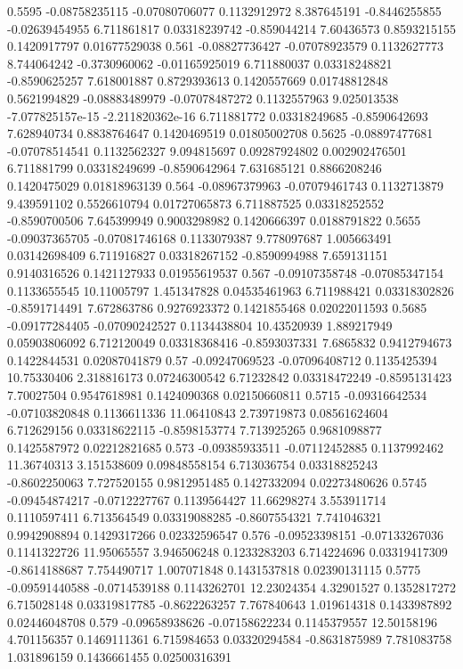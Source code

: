 {0.5595 -0.08758235115 -0.07080706077 0.1132912972 8.387645191 -0.8446255855 -0.02639454955 6.711861817 0.03318239742 -0.859044214 7.60436573 0.8593215155 0.1420917797 0.01677529038
0.561 -0.08827736427 -0.07078923579 0.1132627773 8.744064242 -0.3730960062 -0.01165925019 6.711880037 0.03318248821 -0.8590625257 7.618001887 0.8729393613 0.1420557669 0.01748812848
0.5621994829 -0.08883489979 -0.07078487272 0.1132557963 9.025013538 -7.077825157e-15 -2.211820362e-16 6.711881772 0.03318249685 -0.8590642693 7.628940734 0.8838764647 0.1420469519 0.01805002708
0.5625 -0.08897477681 -0.07078514541 0.1132562327 9.094815697 0.09287924802 0.002902476501 6.711881799 0.03318249699 -0.8590642964 7.631685121 0.8866208246 0.1420475029 0.01818963139
0.564 -0.08967379963 -0.07079461743 0.1132713879 9.439591102 0.5526610794 0.01727065873 6.711887525 0.03318252552 -0.8590700506 7.645399949 0.9003298982 0.1420666397 0.0188791822
0.5655 -0.09037365705 -0.07081746168 0.1133079387 9.778097687 1.005663491 0.03142698409 6.711916827 0.03318267152 -0.8590994988 7.659131151 0.9140316526 0.1421127933 0.01955619537
0.567 -0.09107358748 -0.07085347154 0.1133655545 10.11005797 1.451347828 0.04535461963 6.711988421 0.03318302826 -0.8591714491 7.672863786 0.9276923372 0.1421855468 0.02022011593
0.5685 -0.09177284405 -0.07090242527 0.1134438804 10.43520939 1.889217949 0.05903806092 6.712120049 0.03318368416 -0.8593037331 7.6865832 0.9412794673 0.1422844531 0.02087041879
0.57 -0.09247069523 -0.07096408712 0.1135425394 10.75330406 2.318816173 0.07246300542 6.71232842 0.03318472249 -0.8595131423 7.70027504 0.9547618981 0.1424090368 0.02150660811
0.5715 -0.09316642534 -0.07103820848 0.1136611336 11.06410843 2.739719873 0.08561624604 6.712629156 0.03318622115 -0.8598153774 7.713925265 0.9681098877 0.1425587972 0.02212821685
0.573 -0.09385933511 -0.07112452885 0.1137992462 11.36740313 3.151538609 0.09848558154 6.713036754 0.03318825243 -0.8602250063 7.727520155 0.9812951485 0.1427332094 0.02273480626
0.5745 -0.09454874217 -0.0712227767 0.1139564427 11.66298274 3.553911714 0.1110597411 6.713564549 0.03319088285 -0.8607554321 7.741046321 0.9942908894 0.1429317266 0.02332596547
0.576 -0.09523398151 -0.07133267036 0.1141322726 11.95065557 3.946506248 0.1233283203 6.714224696 0.03319417309 -0.8614188687 7.754490717 1.007071848 0.1431537818 0.02390131115
0.5775 -0.09591440588 -0.0714539188 0.1143262701 12.23024354 4.32901527 0.1352817272 6.715028148 0.03319817785 -0.8622263257 7.767840643 1.019614318 0.1433987892 0.02446048708
0.579 -0.09658938626 -0.07158622234 0.1145379557 12.50158196 4.701156357 0.1469111361 6.715984653 0.03320294584 -0.8631875989 7.781083758 1.031896159 0.1436661455 0.02500316391
}
